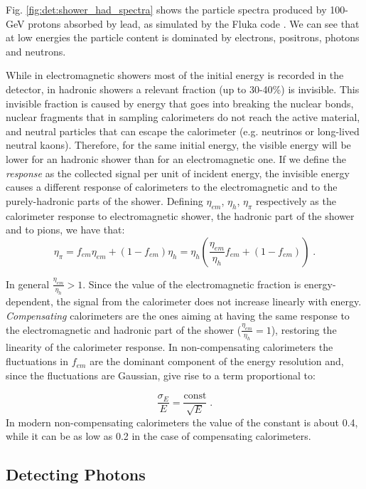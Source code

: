 Fig. \ref{fig:det:shower_had_spectra} shows the particle spectra produced by 100-GeV protons absorbed by lead, as simulated by the Fluka code \cite{Ferrari:898301}. We can see that at low energies the particle content is dominated by electrons, positrons, photons and neutrons.

While in electromagnetic showers most of the initial energy is recorded in the detector, in hadronic showers a relevant fraction (up to 30-40\%) is invisible. This invisible fraction is caused by energy that goes into breaking the nuclear bonds, nuclear fragments that in sampling calorimeters do not reach the active material, and neutral particles that can escape the calorimeter (e.g. neutrinos or long-lived neutral kaons). Therefore, for the same initial energy, the visible energy will be lower for an hadronic shower than for an electromagnetic one. If we define the \textit{response} as the collected signal per unit of incident energy, the invisible energy causes a different response of calorimeters to the electromagnetic and to the purely-hadronic parts of the shower. Defining $\eta_{em}$, $\eta_{h}$, $\eta_{\pi}$ respectively as the calorimeter response to electromagnetic shower, the hadronic part of the shower and to pions, we have that:
\begin{equation}
\eta_{\pi} = f_{em}\eta_{em} + (1-f_{em}) \eta_h = \eta_h \left( \frac{\eta_{em}}{\eta_{h}}f_{em} + (1-f_{em})  \right) \; .
\end{equation}

In general $\frac{\eta_{em}}{\eta_{h}}>1$. Since the value of the electromagnetic fraction is energy-dependent, the signal from the calorimeter does not increase linearly with energy. \textit{Compensating} calorimeters are the ones aiming at having the same response to the electromagnetic and hadronic part of the shower ($\frac{\eta_{em}}{\eta_{h}}=1$), restoring the linearity of the calorimeter response. In non-compensating calorimeters the fluctuations in $f_{em}$ are the dominant component of the energy resolution and, since the fluctuations are Gaussian, give rise to a term proportional to:

\begin{equation}
\frac{\sigma_E}{E} = \frac{\mathrm{const}}{\sqrt{E}}  \; .
\end{equation}
In modern non-compensating calorimeters the value of the constant is about 0.4, while it can be as low as 0.2 in the case of compensating calorimeters.


\subsection{Detecting Photons}

